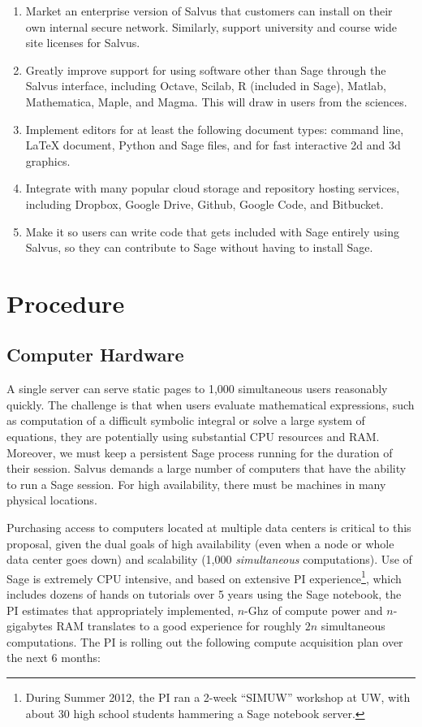 \documentclass[11pt]{article}
\begin{document}
\begin{enumerate}
\item Market an enterprise version of Salvus that customers can
  install on their own internal secure network.
  Similarly, support university and course wide site licenses for
  Salvus.
\item Greatly improve support for using software other than Sage
  through the Salvus interface, including Octave, Scilab, R (included
  in Sage), Matlab, Mathematica, Maple, and Magma. This will draw in
  users from the sciences.
\item Implement editors for at least the following document types:
  command line, \LaTeX{} document, 
  Python and Sage files, and for fast interactive 2d and 3d graphics.
\item Integrate with many popular cloud storage and repository hosting
  services, including Dropbox, Google Drive, Github, Google Code, and
  Bitbucket.
\item Make it so users can write code that
  gets included with Sage entirely using Salvus, so they can
  contribute to Sage without having to install Sage.
\end{enumerate}


\section{Procedure}


\subsection{Computer Hardware}
A single server can serve static pages to 1,000 simultaneous users
reasonably quickly.  The challenge is that when users evaluate
mathematical expressions, such as computation of a difficult symbolic
integral or solve a large system of equations, they are potentially
using substantial CPU resources and RAM. Moreover, we must keep a
persistent Sage process running for the duration of their session.
Salvus demands a large number of computers that have the ability to
run a Sage session.  For high availability, there must be machines in
many physical locations.

Purchasing access to computers located at multiple data centers is
critical to this proposal, given the dual goals of high availability
(even when a node or whole data center goes down) and scalability
(1,000 {\em simultaneous} computations).  Use of Sage is extremely CPU
intensive, and based on extensive PI experience\footnote{During Summer
  2012, the PI ran a 2-week ``SIMUW'' workshop at UW, with about 30
  high school students hammering a Sage notebook server.}, which
includes dozens of hands on tutorials over 5 years using the Sage
notebook, the PI estimates that appropriately implemented, $n$-Ghz
of compute power and $n$-gigabytes RAM translates to a good experience
for roughly $2n$ simultaneous computations.  The PI is rolling out the
following compute acquisition plan over the next 6 months:
\end{document}
